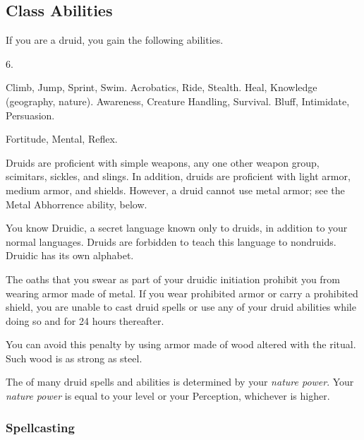     \subsection{Class Abilities}
        If you are a druid, you gain the following abilities.

         6.

         Climb, Jump, Sprint, Swim.
         Acrobatics, Ride, Stealth.
         Heal, Knowledge (geography, nature).
         Awareness, Creature Handling, Survival.
         Bluff, Intimidate, Persuasion.

          Fortitude,  Mental,  Reflex.

        Druids are proficient with simple weapons, any one other weapon group, scimitars, sickles, and slings.
        In addition, druids are proficient with light armor, medium armor, and shields.
        However, a druid cannot use metal armor; see the Metal Abhorrence ability, below.

        You know Druidic, a secret language known only to druids, in addition to your normal languages.
        Druids are forbidden to teach this language to nondruids.
        Druidic has its own alphabet.

        The oaths that you swear as part of your druidic initiation prohibit you from wearing armor made of metal.
        If you wear prohibited armor or carry a prohibited shield, you are unable to cast druid spells or use any of your  druid abilities while doing so and for 24 hours thereafter.
        
        You can avoid this penalty by using armor made of wood altered with the  ritual.
        Such wood is as strong as steel.

        The  of many druid spells and abilities is determined by your \textit{nature power}.
        Your \textit{nature power} is equal to your level or your Perception, whichever is higher.

        \subsubsection{Spellcasting}


